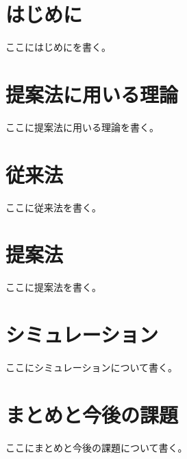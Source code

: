 \documentclass[10pt,twocolumn,fleqn]{jsarticle}
\begin{document}

\section{はじめに}
ここにはじめにを書く。

\section{提案法に用いる理論}
ここに提案法に用いる理論を書く。

\section{従来法}
ここに従来法を書く。

\section{提案法}
ここに提案法を書く。

\section{シミュレーション}
ここにシミュレーションについて書く。

\section{まとめと今後の課題}
ここにまとめと今後の課題について書く。

\small
%
%

\normalsize
\end{document}
